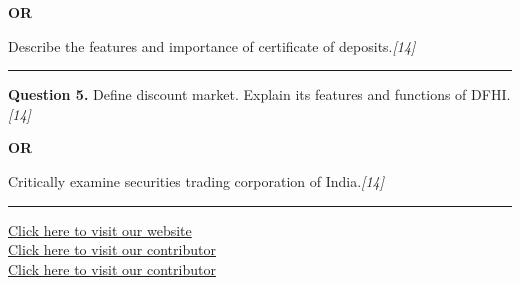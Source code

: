 \documentclass[11pt,a4paper]{article}
\newcommand{\pts}[1]{\hfill   \textit{[#1]}}
\begin{document}
\centerline{   \textbf{OR}}

Describe the features and importance of certificate of deposits.\pts{14}

\medskip\rule{\linewidth}{0.2pt}




\noindent   \textbf{Question 5.}
Define discount market. Explain its features and functions of DFHI.\pts{14}

\centerline{   \textbf{OR}}

Critically examine securities trading corporation of India.\pts{14}

\vfill
\rule{\linewidth}{0.4pt}

\begin{center}\small
\href{https://bhu-exam.vercel.app/}{Click here to visit our website}\\[4pt]
\href{https://me-aryan.vercel.app/}{Click here to visit our contributor}\\[4pt]
\href{https://quashan-me.vercel.app/}{Click here to visit our contributor}
\end{center}
\end{document}
